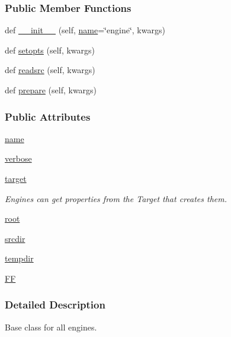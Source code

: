 \subsubsection*{Public Member Functions}
\begin{DoxyCompactItemize}
\item 
def \hyperlink{classsrc_1_1engine_1_1Engine_a11d96735ebad9424597ce5bcc136ecf4}{\+\_\+\+\_\+init\+\_\+\+\_\+} (self, \hyperlink{classsrc_1_1engine_1_1Engine_a267f7ef994287a9c445d23a027b0e34d}{name}=\char`\"{}engine\char`\"{}, kwargs)
\item 
def \hyperlink{classsrc_1_1engine_1_1Engine_a6dbde4ed7e5e4955a87515a6fe9f7519}{setopts} (self, kwargs)
\item 
def \hyperlink{classsrc_1_1engine_1_1Engine_acd90b56501fd1e0ea541ecc7398ba55b}{readsrc} (self, kwargs)
\item 
def \hyperlink{classsrc_1_1engine_1_1Engine_a0ce6a2db9589fcbb740758f1c942029a}{prepare} (self, kwargs)
\end{DoxyCompactItemize}
\subsubsection*{Public Attributes}
\begin{DoxyCompactItemize}
\item 
\hyperlink{classsrc_1_1engine_1_1Engine_a267f7ef994287a9c445d23a027b0e34d}{name}
\item 
\hyperlink{classsrc_1_1engine_1_1Engine_a6326b913644ba439cfe65522d07e963b}{verbose}
\item 
\hyperlink{classsrc_1_1engine_1_1Engine_afb0e130791ea1088dbc5386b2ea01811}{target}
\begin{DoxyCompactList}\small\item\em Engines can get properties from the Target that creates them. \end{DoxyCompactList}\item 
\hyperlink{classsrc_1_1engine_1_1Engine_aa9d5440600744dfb9cc728400635664d}{root}
\item 
\hyperlink{classsrc_1_1engine_1_1Engine_abf2834da51abf75377353cc0a37dbaa2}{srcdir}
\item 
\hyperlink{classsrc_1_1engine_1_1Engine_a26eb38a46966e497df7b8f414d760a41}{tempdir}
\item 
\hyperlink{classsrc_1_1engine_1_1Engine_a0473b94a475e233e89eac181516c929c}{FF}
\end{DoxyCompactItemize}


\subsubsection{Detailed Description}
Base class for all engines. 


